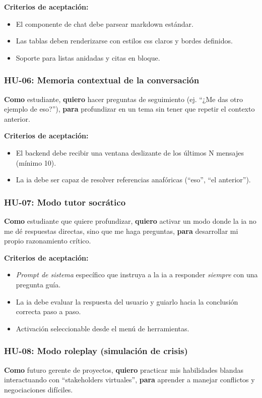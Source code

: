 \textbf{Criterios de aceptación:}
\begin{itemize}
\item El componente de chat debe parsear markdown estándar.
\item Las tablas deben renderizarse con estilos \gls{css} claros y bordes definidos.
\item Soporte para listas anidadas y citas en bloque.
\end{itemize}

\subsubsection{HU-06: Memoria contextual de la conversación}
\textbf{Como} estudiante,
\textbf{quiero} hacer preguntas de seguimiento (ej. \enquote{¿Me das otro ejemplo de eso?}),
\textbf{para} profundizar en un tema sin tener que repetir el contexto anterior.

\textbf{Criterios de aceptación:}
\begin{itemize}
\item El backend debe recibir una ventana deslizante de los últimos N mensajes (mínimo 10).
\item La \gls{ia} debe ser capaz de resolver referencias anafóricas (\enquote{eso}, \enquote{el anterior}).
\end{itemize}

\subsubsection{HU-07: Modo tutor socrático}
\textbf{Como} estudiante que quiere profundizar,
\textbf{quiero} activar un modo donde la \gls{ia} no me dé respuestas directas, sino que me haga preguntas,
\textbf{para} desarrollar mi propio razonamiento crítico.

\textbf{Criterios de aceptación:}
\begin{itemize}
\item \textit{Prompt de sistema} específico que instruya a la \gls{ia} a responder \textit{siempre} con una pregunta guía.
\item La \gls{ia} debe evaluar la respuesta del usuario y guiarlo hacia la conclusión correcta paso a paso.
\item Activación seleccionable desde el menú de herramientas.
\end{itemize}

\subsubsection{HU-08: Modo roleplay (simulación de crisis)}
\textbf{Como} futuro gerente de proyectos,
\textbf{quiero} practicar mis habilidades blandas interactuando con \enquote{stakeholders virtuales},
\textbf{para} aprender a manejar conflictos y negociaciones difíciles.

